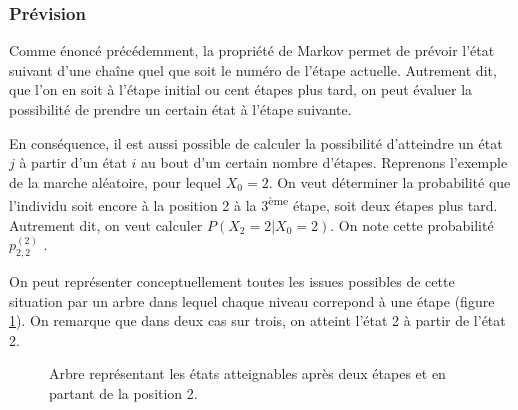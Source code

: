 \documentclass[12pt]{article}
\begin{document}
\subsubsection{Prévision}

Comme énoncé précédemment, la propriété de Markov permet de prévoir
l'état suivant d'une chaîne quel que soit le numéro de l'étape
actuelle. Autrement dit, que l'on en soit à l'étape initial ou cent
étapes plus tard, on peut évaluer la possibilité de prendre un certain
état à l'étape suivante.

En conséquence, il est aussi possible de calculer la possibilité
d'atteindre un état $j$ à partir d'un état $i$ au bout d'un certain
nombre d'étapes. Reprenons l'exemple de la marche aléatoire, pour
lequel $X_0 = 2$. On veut déterminer la probabilité que l'individu
soit encore à la position 2 à la 3\textsuperscript{ème} étape, soit
deux étapes plus tard. Autrement dit, on veut calculer $P(X_2 = 2 |
X_0 = 2)$. On note cette probabilité $p^{(2)}_{2,2}$ \cite{green}.

On peut représenter conceptuellement toutes les issues possibles de
cette situation par un arbre dans lequel chaque niveau correpond à une
étape (figure \ref{arbre}). On remarque que dans deux cas sur trois,
on atteint l'état 2 à partir de l'état 2.

\begin{figure}[H]
\centering


\caption{Arbre représentant les états atteignables après deux étapes
  et en partant de la position 2.}
\label{arbre}

\end{figure}
\end{document}
